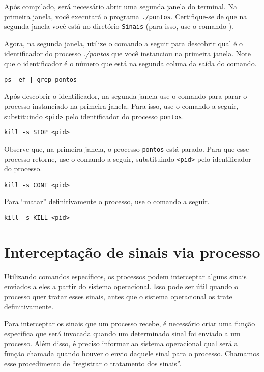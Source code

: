Após compilado, será necessário abrir uma segunda janela do terminal. Na primeira janela, você executará o programa \texttt{./pontos}. Certifique-se de que na segunda janela você está no diretório \texttt{Sinais} (para isso, use o comando ).

Agora, na segunda janela, utilize o comando a seguir para descobrir qual é o identificador do processo \textit{./pontos} que você instanciou na primeira janela. Note que o identificador é o número que está na segunda coluna da saída do comando.

\begin{lstlisting}[style=MyBashStyle]
ps -ef | grep pontos
\end{lstlisting}

Após descobrir o identificador, na segunda janela use o comando  para parar o processo instanciado na primeira janela. Para isso, use o comando a seguir, substituindo \texttt{<pid>} pelo identificador do processo \texttt{pontos}.

\begin{lstlisting}[style=MyBashStyle]
kill -s STOP <pid>
\end{lstlisting}

Observe que, na primeira janela, o processo \texttt{pontos} está parado. Para que esse processo retorne, use o comando a seguir, substituindo \texttt{<pid>} pelo identificador do processo.

\begin{lstlisting}[style=MyBashStyle]
kill -s CONT <pid>
\end{lstlisting}

Para \enquote{matar} definitivamente o processo, use o comando a seguir.

\begin{lstlisting}[style=MyBashStyle]
kill -s KILL <pid>
\end{lstlisting}


\section{Interceptação de sinais via processo}
Utilizando comandos específicos, os processos podem interceptar alguns sinais enviados a eles a partir do sistema operacional. Isso pode ser útil quando o processo quer tratar esses sinais, antes que o sistema operacional os trate definitivamente.

Para interceptar os sinais que um processo recebe, é necessário criar uma função específica que será invocada quando um determinado sinal foi enviado a um processo. Além disso, é preciso informar ao sistema operacional qual será a função chamada quando houver o envio daquele sinal para o processo. Chamamos esse procedimento de \enquote{registrar o tratamento dos sinais}.

